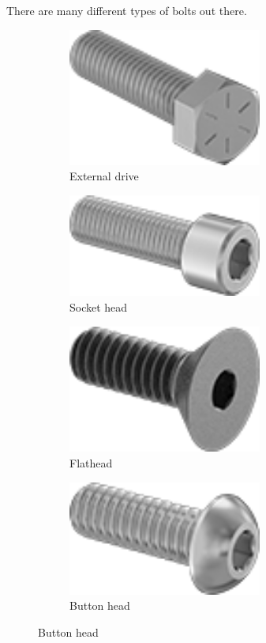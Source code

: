 	There are many different types of bolts out there.
	\begin{figure}[H]
		\centering
		\begin{subfigure}[b]{.24\linewidth}
			\includegraphics[width=0.7\textwidth]{imgs/hhcs.png}
			\caption{External drive}
		\end{subfigure}\begin{subfigure}[b]{.24\linewidth}
			\includegraphics[width=0.7\textwidth]{imgs/shcs.png}
			\caption{Socket head}
		\end{subfigure}\begin{subfigure}[b]{.24\linewidth}
			\includegraphics[width=0.7\textwidth]{imgs/fhcs.png}
			\caption{Flathead}
		\end{subfigure}\begin{subfigure}[b]{.24\linewidth}
			\includegraphics[width=0.7\textwidth]{imgs/bhcs.png}
			\caption{Button head}
		\end{subfigure}
		

\end{figure}
